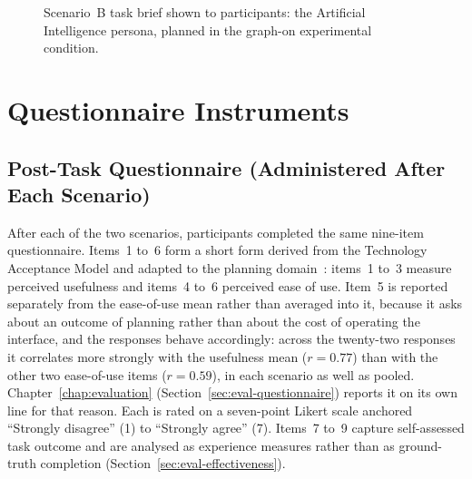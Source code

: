 \begin{figure}[htpb]
    \centering
    \caption{Scenario~B task brief shown to participants: the Artificial Intelligence persona, planned in the graph-on experimental condition.}
    \label{fig:scenario-b}
\end{figure}


\section{Questionnaire Instruments}
\label{app:eval-instruments}
\subsection{Post-Task Questionnaire (Administered After Each Scenario)}

After each of the two scenarios, participants completed the same nine-item questionnaire. Items~1 to~6 form a short form derived from the Technology Acceptance Model and adapted to the planning domain~\cite{davis_perceived_1989}: items~1 to~3 measure perceived usefulness and items~4 to~6 perceived ease of use. Item~5 is reported separately from the ease-of-use mean rather than averaged into it, because it asks about an outcome of planning rather than about the cost of operating the interface, and the responses behave accordingly: across the twenty-two responses it correlates more strongly with the usefulness mean ($r = 0.77$) than with the other two ease-of-use items ($r = 0.59$), in each scenario as well as pooled. Chapter~\ref{chap:evaluation} (Section~\ref{sec:eval-questionnaire}) reports it on its own line for that reason. Each is rated on a seven-point Likert scale anchored \enquote{Strongly disagree} (1) to \enquote{Strongly agree} (7). Items~7 to~9 capture self-assessed task outcome and are analysed as experience measures rather than as ground-truth completion (Section~\ref{sec:eval-effectiveness}).

